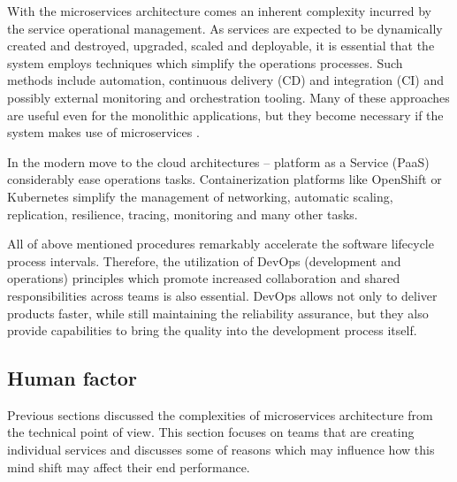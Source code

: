\documentclass[oneside,
  digital, %
  table,   %
  lof,     %
  lot,     %
]{fithesis3}
\begin{document}
With the microservices architecture comes an inherent complexity incurred by the service operational management. As services are expected to be dynamically created and destroyed, upgraded, scaled and deployable, it is essential that the system employs techniques which simplify the operations processes. Such methods include automation, continuous delivery (CD) and integration (CI) and possibly external monitoring and orchestration tooling. Many of these approaches are useful even for the monolithic applications, but they become necessary if the system makes use of microservices \cite{ms_tradeoffs}.

In the modern move to the cloud architectures -- platform as a Service (PaaS) considerably ease operations tasks. Containerization platforms like OpenShift \cite{openshift} or Kubernetes \cite{kubernetes} simplify the management of networking, automatic scaling, replication, resilience, tracing, monitoring and many other tasks.

All of above mentioned procedures remarkably accelerate the software lifecycle process intervals. Therefore, the utilization of DevOps (development and operations) principles which promote increased collaboration and shared responsibilities across teams is also essential. DevOps allows not only to deliver products faster, while still maintaining the reliability assurance, but they also provide capabilities to bring the quality into the development process itself.

\subsection{Human factor}

Previous sections discussed the complexities of microservices architecture from the technical point of view. This section focuses on teams that are creating individual services and discusses some of reasons which may influence how this mind shift may affect their end performance.
\end{document}
